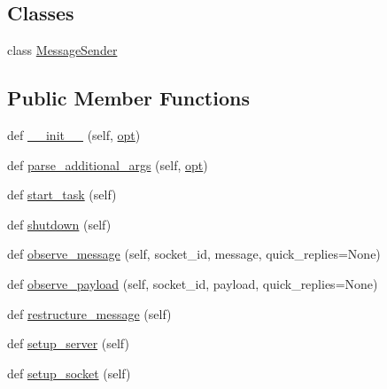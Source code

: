 \subsection*{Classes}
\begin{DoxyCompactItemize}
\item 
class \hyperlink{classparlai_1_1chat__service_1_1services_1_1websocket_1_1websocket__manager_1_1WebsocketManager_1_1MessageSender}{Message\+Sender}
\end{DoxyCompactItemize}
\subsection*{Public Member Functions}
\begin{DoxyCompactItemize}
\item 
def \hyperlink{classparlai_1_1chat__service_1_1services_1_1websocket_1_1websocket__manager_1_1WebsocketManager_ae44392cd364b3041420877e4f281261e}{\+\_\+\+\_\+init\+\_\+\+\_\+} (self, \hyperlink{classparlai_1_1chat__service_1_1services_1_1websocket_1_1websocket__manager_1_1WebsocketManager_a48a72c535cb36615ba3f698446ab4aef}{opt})
\item 
def \hyperlink{classparlai_1_1chat__service_1_1services_1_1websocket_1_1websocket__manager_1_1WebsocketManager_ab5ae0fc35ee7b4c2015954814b8b60de}{parse\+\_\+additional\+\_\+args} (self, \hyperlink{classparlai_1_1chat__service_1_1services_1_1websocket_1_1websocket__manager_1_1WebsocketManager_a48a72c535cb36615ba3f698446ab4aef}{opt})
\item 
def \hyperlink{classparlai_1_1chat__service_1_1services_1_1websocket_1_1websocket__manager_1_1WebsocketManager_a79bfe4b1d87644284affbe3963c8decd}{start\+\_\+task} (self)
\item 
def \hyperlink{classparlai_1_1chat__service_1_1services_1_1websocket_1_1websocket__manager_1_1WebsocketManager_a50a3ee9e3306b49c38eb1c480aa03734}{shutdown} (self)
\item 
def \hyperlink{classparlai_1_1chat__service_1_1services_1_1websocket_1_1websocket__manager_1_1WebsocketManager_ab4710951b0d3ac7e00836c15760edf4a}{observe\+\_\+message} (self, socket\+\_\+id, message, quick\+\_\+replies=None)
\item 
def \hyperlink{classparlai_1_1chat__service_1_1services_1_1websocket_1_1websocket__manager_1_1WebsocketManager_a71ce917832632d10f3aafd6e8644d3f5}{observe\+\_\+payload} (self, socket\+\_\+id, payload, quick\+\_\+replies=None)
\item 
def \hyperlink{classparlai_1_1chat__service_1_1services_1_1websocket_1_1websocket__manager_1_1WebsocketManager_ab50f384331aea23175f690642717958a}{restructure\+\_\+message} (self)
\item 
def \hyperlink{classparlai_1_1chat__service_1_1services_1_1websocket_1_1websocket__manager_1_1WebsocketManager_abd3815e2b102c46a68be1f907749cd05}{setup\+\_\+server} (self)
\item 
def \hyperlink{classparlai_1_1chat__service_1_1services_1_1websocket_1_1websocket__manager_1_1WebsocketManager_adc9f886e43d7bf42941cf95914468817}{setup\+\_\+socket} (self)
\end{DoxyCompactItemize}
